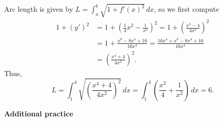 \documentclass[12pt]{article}
\begin{document}
\begin{enumerate}
\medskip

Arc length is given by $L=\int_a^b\sqrt{1+f'(x)^2}\,dx$, so we first compute
\begin{align*}
 1+(y')^2 & = 1+ \left(\frac{1}{4}x^2-\frac{1}{x^2}\right)^2 = 1+\left(\frac{x^4-4}{4x^2}\right)^2\\
& = 1+\frac{x^8-8x^4+16}{16x^4} = \frac{16x^4+x^8-8x^4+16}{16x^4}\\
& = \left(\frac{x^4+4}{4x^2}\right)^2.
\end{align*}
Thus, 
\[
 L = \int_1^4 \sqrt{\left(\frac{x^4+4}{4x^2}\right)^2}\,dx = \int_1^4 \left(\frac{x^2}{4}+\frac{1}{x^2}\right)\,dx = 6.
\]

\end{enumerate}

\pagebreak

\textbf{Additional practice} 
\end{document}
